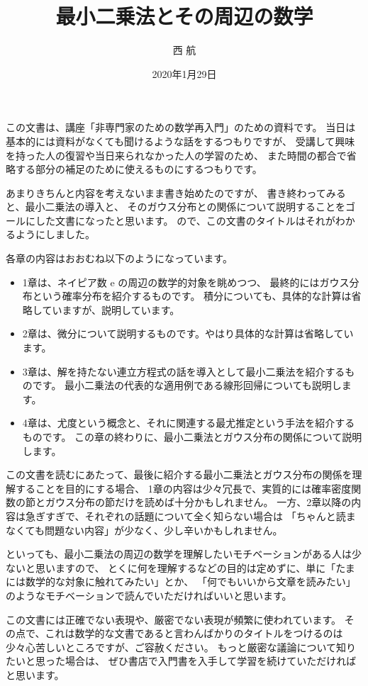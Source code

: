 \documentclass[uplatex,dvipdfmx]{jsarticle}
\begin{document}
\title{最小二乗法とその周辺の数学}
\author{西 航}
\date{2020年1月29日}
\maketitle

この文書は、講座「非専門家のための数学再入門」のための資料です。
当日は基本的には資料がなくても聞けるような話をするつもりですが、
受講して興味を持った人の復習や当日来られなかった人の学習のため、
また時間の都合で省略する部分の補足のために使えるものにするつもりです。

あまりきちんと内容を考えないまま書き始めたのですが、
書き終わってみると、最小二乗法の導入と、
そのガウス分布との関係について説明することをゴールにした文書になったと思います。
ので、この文書のタイトルはそれがわかるようにしました。

各章の内容はおおむね以下のようになっています。
\begin{itemize}
  \item 1章は、ネイピア数 $\mathrm{e}$ の周辺の数学的対象を眺めつつ、
        最終的にはガウス分布という確率分布を紹介するものです。
        積分についても、具体的な計算は省略していますが、説明しています。
  \item 2章は、微分について説明するものです。やはり具体的な計算は省略しています。
  \item 3章は、解を持たない連立方程式の話を導入として最小二乗法を紹介するものです。
        最小二乗法の代表的な適用例である線形回帰についても説明します。
  \item 4章は、尤度という概念と、それに関連する最尤推定という手法を紹介するものです。
        この章の終わりに、最小二乗法とガウス分布の関係について説明します。
\end{itemize}

この文書を読むにあたって、最後に紹介する最小二乗法とガウス分布の関係を理解することを目的にする場合、
1章の内容は少々冗長で、実質的には確率密度関数の節とガウス分布の節だけを読めば十分かもしれません。
一方、2章以降の内容は急ぎすぎで、それぞれの話題について全く知らない場合は
「ちゃんと読まなくても問題ない内容」が少なく、少し辛いかもしれません。

といっても、最小二乗法の周辺の数学を理解したいモチベーションがある人は少ないと思いますので、
とくに何を理解するなどの目的は定めずに、単に「たまには数学的な対象に触れてみたい」とか、
「何でもいいから文章を読みたい」のようなモチベーションで読んでいただければいいと思います。

この文書には正確でない表現や、厳密でない表現が頻繁に使われています。
その点で、これは数学的な文書であると言わんばかりのタイトルをつけるのは
少々心苦しいところですが、ご容赦ください。
もっと厳密な議論について知りたいと思った場合は、
ぜひ書店で入門書を入手して学習を続けていただければと思います。
\end{document}
